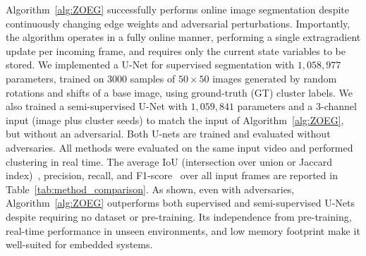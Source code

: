 \documentclass{article}
\theoremstyle{plain}
\theoremstyle{definition}
\theoremstyle{remark}
\begin{document}
Algorithm~\ref{alg:ZOEG} successfully performs online image segmentation despite continuously changing edge weights and adversarial perturbations. Importantly, the algorithm operates in a fully online manner, performing a single extragradient update per incoming frame, and requires only the current state variables to be stored. 
We implemented a U-Net for supervised segmentation with $1{,}058{,}977$ parameters, trained on $3000$ samples of $50\times50$ images generated by random rotations and shifts of a base image, using ground-truth (GT) cluster labels. We also trained a semi-supervised U-Net with $1{,}059{,}841$ parameters and a 3-channel input (image plus cluster seeds) to match the input of Algorithm~\ref{alg:ZOEG}, but without an adversarial.  Both U-nets are trained and evaluated without adversaries.
All methods were evaluated on the same input video and performed clustering in real time. The average IoU (intersection over union or Jaccard index)~\cite{rota2017loss}, precision, recall, and F1-score~\cite{manning2008introduction} over all input frames are reported in Table~\ref{tab:method_comparison}. As shown, even with adversaries, Algorithm~\ref{alg:ZOEG} outperforms both supervised and semi-supervised U-Nets despite requiring no dataset or pre-training. Its independence from pre-training, real-time performance in unseen environments, and low memory footprint make it well-suited for embedded systems.
\end{document}
